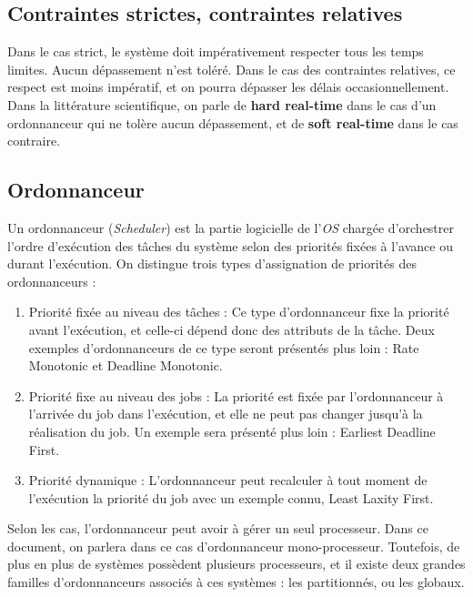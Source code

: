 \documentclass[11pt,a4paper,oneside]{report}
\begin{document}
\subsection{Contraintes strictes, contraintes relatives} 
Dans le cas strict, le système doit impérativement respecter tous les temps limites. Aucun dépassement n'est toléré. Dans le cas des contraintes relatives, ce respect 
est moins impératif, et on pourra dépasser les délais occasionnellement. \\
Dans la littérature scientifique, on parle de \textbf{hard real-time} dans le cas d'un ordonnanceur 
qui ne tolère aucun dépassement, et de \textbf{soft real-time} dans le cas contraire.

\subsection{Ordonnanceur}
Un ordonnanceur (\textit{Scheduler}) est la partie logicielle de 
l'\textit{OS} chargée d'orchestrer l'ordre d'exécution des tâches du système 
selon des priorités fixées à l'avance ou durant l'exécution. 
On distingue trois types d'assignation de priorités des ordonnanceurs : \\
\begin{enumerate}
	\item Priorité fixée au niveau des tâches : Ce type d'ordonnanceur fixe la priorité 
	avant l'exécution, et celle-ci dépend donc des attributs de la tâche. 
	Deux exemples d'ordonnanceurs de ce type seront présentés plus loin : Rate Monotonic et 
	Deadline Monotonic.
	\item Priorité fixe au niveau des jobs : La priorité est fixée par l'ordonnanceur à l'arrivée du job 
	dans l'exécution, et elle ne peut pas changer jusqu'à la réalisation du job. Un exemple sera présenté plus loin : Earliest Deadline First.
	\item Priorité dynamique : L'ordonnanceur peut recalculer à tout moment de l'exécution 
	la priorité du job avec un exemple connu, Least Laxity First\cite{hutchison_predictability_2006}.
\end{enumerate}
	
Selon les cas, l'ordonnanceur peut avoir à gérer un seul processeur. Dans ce 
document, on parlera dans ce cas d'ordonnanceur mono-processeur. Toutefois, de plus en 
plus de systèmes possèdent plusieurs processeurs, et il existe deux grandes familles 
d'ordonnanceurs associés à ces systèmes : les partitionnés, ou les globaux. \\
\end{document}
